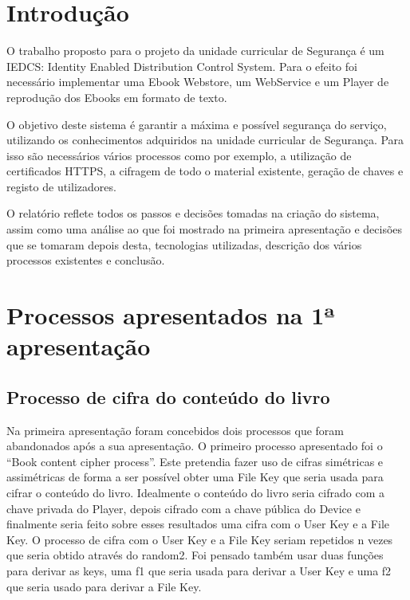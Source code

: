 \documentclass[pdftex,12pt,a4paper]{report}
\begin{document}
\renewcommand{\headrulewidth}{0pt}

\fancyhead{}
\fancyfoot{}
\rfoot{\thepage}

\renewcommand*\contentsname{Conteúdos}
\renewcommand*\figurename{Figura}
\renewcommand*\tablename{Tabela}

\tableofcontents
\renewcommand{\headrulewidth}{0.15pt}
\renewcommand{\thechapter}{}


\clearpage

\section{Introdução}
O trabalho proposto para o projeto da unidade curricular de Segurança é um IEDCS: Identity Enabled Distribution Control System. Para o  efeito foi necessário implementar uma Ebook Webstore, um WebService e um Player de reprodução dos Ebooks em formato de texto.

O objetivo deste sistema é garantir a máxima e possível segurança do serviço, utilizando os conhecimentos adquiridos na unidade curricular de Segurança. Para isso são necessários vários processos como por exemplo, a utilização de certificados HTTPS, a cifragem de todo o material existente, geração de chaves e registo de utilizadores.	

O relatório reflete todos os passos e decisões tomadas na criação do sistema, assim como uma análise ao que foi mostrado na primeira apresentação e decisões que se tomaram depois desta, tecnologias utilizadas, descrição dos vários processos existentes e conclusão.

\newpage
\section{Processos apresentados na 1ª apresentação}

\subsection{Processo de cifra do conteúdo do livro}
Na primeira apresentação foram concebidos dois processos que foram abandonados após a sua apresentação. O primeiro processo apresentado foi o “Book content cipher process”. Este pretendia fazer uso de cifras simétricas e assimétricas de forma a ser possível obter uma File Key que seria usada para cifrar o conteúdo do livro. Idealmente o conteúdo do livro seria cifrado com a chave privada do Player, depois cifrado com a chave pública do Device e finalmente seria feito sobre esses resultados uma cifra com o User Key e a File Key. O processo de cifra com o User Key e a File Key seriam repetidos n vezes que seria obtido através do random2. Foi pensado também usar duas funções para derivar as keys, uma f1 que seria usada para derivar a User Key e uma f2 que seria usado para derivar a File Key.
\end{document}
